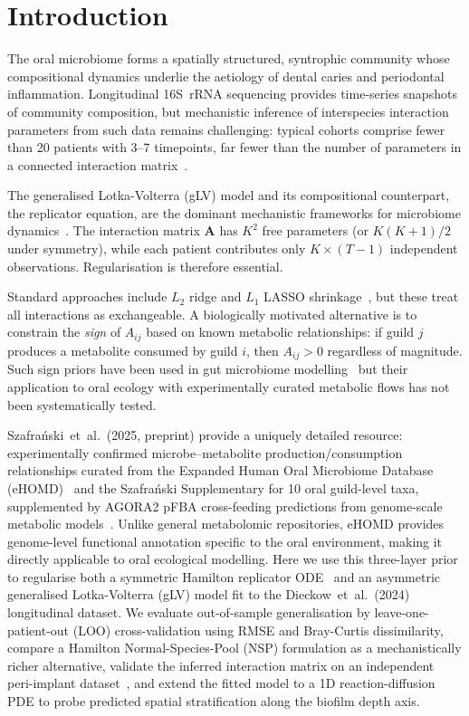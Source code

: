\documentclass[11pt,a4paper]{article}
\newcommand{\bA}{\mathbf{A}}
\begin{document}
\bigskip
\tableofcontents
\bigskip

\section{Introduction}
\label{sec:intro}

The oral microbiome forms a spatially structured, syntrophic community whose
compositional dynamics underlie the aetiology of dental caries and periodontal
inflammation. Longitudinal 16S~rRNA sequencing provides time-series snapshots of
community composition, but mechanistic inference of interspecies interaction parameters
from such data remains challenging: typical cohorts comprise fewer than 20 patients
with 3--7 timepoints, far fewer than the number of parameters in a connected
interaction matrix~\citep{stein2013, joseph2020}.

The generalised Lotka-Volterra (gLV) model and its compositional counterpart, the
replicator equation, are the dominant mechanistic frameworks for microbiome
dynamics~\citep{fisher2014, bashan2016}. The interaction matrix $\bA$ has $K^2$
free parameters (or $K(K+1)/2$ under symmetry), while each patient contributes
only $K\!\times\!(T-1)$ independent observations. Regularisation is therefore essential.

Standard approaches include $L_2$ ridge and $L_1$ LASSO shrinkage~\citep{kuntal2019},
but these treat all interactions as exchangeable. A biologically motivated alternative
is to constrain the \emph{sign} of $A_{ij}$ based on known metabolic relationships:
if guild $j$ produces a metabolite consumed by guild $i$, then $A_{ij}>0$ regardless
of magnitude. Such sign priors have been used in gut microbiome modelling~\citep{cao2017}
but their application to oral ecology with experimentally curated metabolic flows
has not been systematically tested.

Szafra\'{n}ski~et~al.\ (2025, preprint) provide a uniquely detailed resource:
experimentally confirmed microbe--metabolite production/consumption relationships
curated from the Expanded Human Oral Microbiome Database (eHOMD)~\citep{chen2010}
and the Szafra\'{n}ski Supplementary for 10 oral guild-level taxa,
supplemented by AGORA2 pFBA cross-feeding predictions from genome-scale metabolic
models~\citep{heinken2023}. Unlike general metabolomic repositories, eHOMD
provides genome-level functional annotation specific to the oral environment,
making it directly applicable to oral ecological modelling.
Here we use this three-layer prior to regularise both a symmetric Hamilton replicator
ODE~\citep{klempt2024, klempt2025} and an asymmetric generalised Lotka-Volterra (gLV)
model fit to the Dieckow~et~al.~(2024) longitudinal dataset.
We evaluate out-of-sample generalisation by leave-one-patient-out (LOO) cross-validation
using RMSE and Bray-Curtis dissimilarity, compare a Hamilton Normal-Species-Pool (NSP)
formulation as a mechanistically richer alternative, validate the inferred interaction
matrix on an independent peri-implant dataset~\citep{szafranski2025}, and extend the
fitted model to a 1D reaction-diffusion PDE to probe predicted spatial stratification
along the biofilm depth axis.
\end{document}
